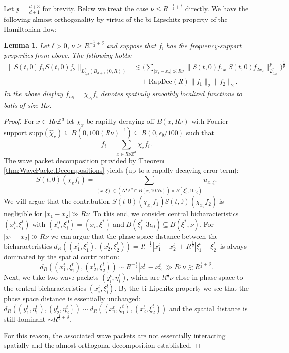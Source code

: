 \documentclass{amsart}
\newtheorem{lemma}[theorem]{Lemma}
\theoremstyle{definition}
\newcommand{\Z}{\mathbb{Z}}
\begin{document}
Let $p = \frac{d+3}{d+1}$ for brevity. Below we treat the case $\nu \leq R^{-\frac{1}{2}+\delta}$ directly. We have the following almost orthogonality by virtue of the bi-Lipschitz property of the Hamiltonian flow:
\begin{lemma}
Let $\delta > 0$, $\nu \geq R^{-\frac{1}{2}+\delta}$ and suppose that $f_i$ has the frequency-support properties from above. The following holds:
\begin{equation*}
\begin{split}
\| S(t,0) f_1 S(t,0) f_2 \|_{L^p_{t,x}(B_{d+1}(0,R))} &\lesssim \big( \sum_{|x_1-x_2| \lesssim R \nu } \| S(t,0) f_{1 x_1} S(t,0) f_{2 x_2} \|_{L^p_{t,x}}^p \big)^{\frac{1}{p}} \\
&\quad + \text{RapDec}(R) \| f_1 \|_2 \| f_2 \|_2.
\end{split}
\end{equation*}
In the above display $f_{i x_i} = \chi_{x_i} f_i$ denotes spatially smoothly localized functions to balls of size $R \nu$.
\end{lemma}
\begin{proof}
For $x \in R \nu \Z^d$ let $\chi_x$ be rapidly decaying off $B(x,R \nu)$ with Fourier support $\text{supp}(\hat{\chi}_x) \subseteq B(0,100 (R \nu)^{-1}) \subseteq B(0,\epsilon_0/100)$ such that
\begin{equation*}
f_i = \sum_{x \in R \nu \Z^d} \chi_x f_i.
\end{equation*}
The wave packet decomposition provided by Theorem \ref{thm:WavePacketDecompositions} yields (up to a rapidly decaying error term):
\begin{equation*}
S(t,0) (\chi_x f_i) = \sum_{(x,\xi) \in (N^{\frac{1}{2}} \Z^d \cap B(x,10 N \nu)) \times B(\xi_i^*, 10 \epsilon_0)} u_{x,\xi}.
\end{equation*}
We will argue that the contribution $S(t,0) (\chi_{x_1} f_1) S(t,0) (\chi_{x_2} f_2)$ is negligible for $|x_1-x_2| \gg R \nu$. To this end, we consider central bicharacteristics $(x_i^t,\xi_i^t)$ with $(x_i^0,\xi_i^0) = (x_i,\xi^*)$ and $B(\xi_i^*,3 \epsilon_0) \subseteq B(\xi^*,\nu)$. For $|x_1-x_2| \gg R \nu$ we can argue that the phase space distance between the bicharacteristics $d_R((x_1^t,\xi^t_1),(x_2^t,\xi_2^t)) = R^{-\frac{1}{2}} |x_1^t - x_2^t| + R^{\frac{1}{2}} |\xi_1^t - \xi_2^t|$ is always dominated by the spatial contribution:
\begin{equation*}
d_R((x_1^t,\xi^t_1),(x_2^t,\xi_2^t)) \sim R^{-\frac{1}{2}} |x_1^t - x_2^t| \gg R^{\frac{1}{2}} \nu \gtrsim R^{\frac{1}{2}+\delta}.
\end{equation*}
Next, we take two wave packets $(y_i^t,\eta_i^t)$, which are $R^{\frac{1}{2}} \nu$-close in phase space to the central bicharacteristics $(x_i^t,\xi_i^t)$. By the bi-Lipchitz property we see that the phase space distance is essentially unchanged: $d_R((y_1^t,\eta_1^t),(y_2^t,\eta_2^t)) \sim d_R((x_1^t,\xi_1^t),(x_2^t,\xi_2^t))$ and the spatial distance is still dominant $\sim R^{\frac{1}{2} + \delta}.$

For this reason, the associated wave packets are not essentially interacting spatially and the almost orthogonal decomposition established.
\end{proof}
\end{document}
